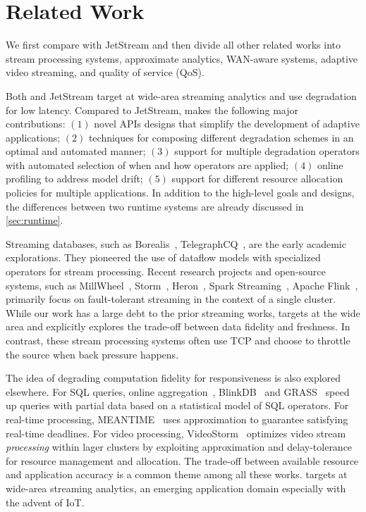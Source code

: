 \section{Related Work}
\label{sec:related-work}

We first compare \sysname{} with JetStream and then divide all other related
works into stream processing systems, approximate analytics, WAN-aware systems,
adaptive video streaming, and quality of service (QoS).

 Both \sysname{} and JetStream target at wide-area streaming
analytics and use degradation for low latency. Compared to JetStream, \sysname{}
makes the following major contributions: $(1)$ novel APIs designs that simplify
the development of adaptive applications; $(2)$ techniques for composing
different degradation schemes in an optimal and automated manner; $(3)$ support
for multiple degradation operators with automated selection of when and how
operators are applied; $(4)$ online profiling to address model drift; $(5)$
support for different resource allocation policies for multiple applications. In
addition to the high-level goals and designs, the differences between two
runtime systems are already discussed in \autoref{sec:runtime}.

 Streaming databases, such as
Borealis~\cite{abadi2005design},
TelegraphCQ~\cite{chandrasekaran2003telegraphcq}, are the early academic
explorations. They pioneered the use of dataflow models with specialized
operators for stream processing. Recent research projects and open-source
systems, such as MillWheel~\cite{akidau2013millwheel},
Storm~\cite{toshniwal2014storm}, Heron~\cite{sanjeev2015twitter}, Spark
Streaming~\cite{zaharia2013discretized}, Apache Flink~\cite{carbone2015apache},
primarily focus on fault-tolerant streaming in the context of a single
cluster. While our work has a large debt to the prior streaming works,
\sysname{} targets at the wide area and explicitly explores the trade-off
between data fidelity and freshness. In contrast, these stream processing
systems often use TCP and choose to throttle the source when back pressure
happens.

 The idea of degrading computation fidelity for
responsiveness is also explored elsewhere. For SQL queries, online
aggregation~\cite{hellerstein1997online}, BlinkDB~\cite{agarwal2013blinkdb} and
GRASS~\cite{ananthanarayanan2014grass} speed up queries with partial data based
on a statistical model of SQL operators. For real-time processing,
MEANTIME~\cite{farrell2016meantime} uses approximation to guarantee satisfying
real-time deadlines. For video processing, VideoStorm~\cite{zhang2017live}
optimizes video stream \textit{processing} within lager clusters by exploiting
approximation and delay-tolerance for resource management and allocation. The
trade-off between available resource and application accuracy is a common theme
among all these works. \sysname{} targets at wide-area streaming analytics, an
emerging application domain especially with the advent of IoT\@.

